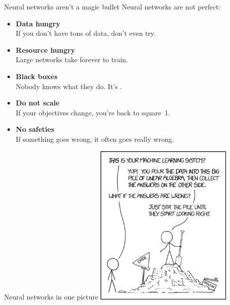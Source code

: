 \documentclass[xcolor={usenames,svgnames,x11names,dvipsnames,table}]{beamer}
\begin{document}
\begin{frame}{Neural networks aren't a magic bullet}
    Neural networks are not perfect:
    \begin{itemize}
        \item \textbf{Data hungry}\\
              If you don't have tons of data, don't even try.
        \item \textbf{Resource hungry}\\
              Large networks take forever to train.
        \item \textbf{Black boxes}\\
              Nobody knows what they do.
              It's .
        \item \textbf{Do not scale}\\
              If your objectives change, you're back to square~1.
        \item \textbf{No safeties}\\
              If something goes wrong, it often goes really wrong.
    \end{itemize}
\end{frame}

\begin{frame}{Neural networks in one picture}
    \centering
    \includegraphics[width=18em]{./img/xkcd}
\end{frame}
\end{document}
